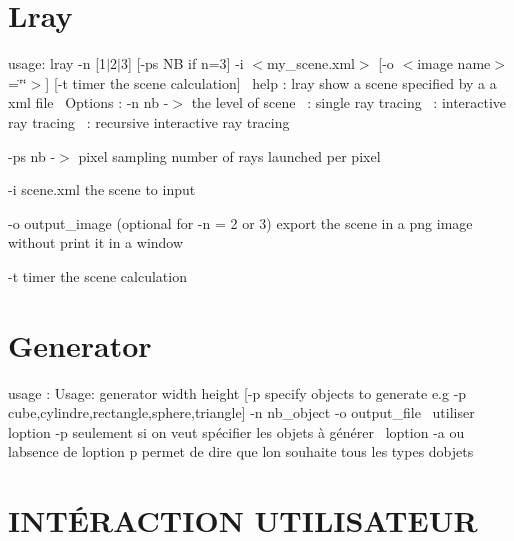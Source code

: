 \section*{Lray}

usage\+: lray -\/n \mbox{[}1$\vert$2$\vert$3\mbox{]} \mbox{[}-\/ps NB if n=3\mbox{]} -\/i $<$my\+\_\+scene.\+xml$>$ \mbox{[}-\/o $<$image name$>$=\char`\"{}\char`\"{}$>$\mbox{]} \mbox{[}-\/t timer the scene calculation\mbox{]}~\newline
 help \+: lray show a scene specified by a a xml file~\newline
 Options \+: -\/n nb -\/$>$ the level of scene ~\+: single ray tracing ~\+: interactive ray tracing ~\+: recursive interactive ray tracing

-\/ps nb -\/$>$ pixel sampling number of rays launched per pixel

-\/i scene.\+xml the scene to input

-\/o output\+\_\+image (optional for -\/n = 2 or 3) export the scene in a png image without print it in a window

-\/t timer the scene calculation

\section*{Generator}

usage \+: Usage\+: generator width height \mbox{[}-\/p specify objects to generate e.\+g -\/p cube,cylindre,rectangle,sphere,triangle\mbox{]} -\/n nb\+\_\+object -\/o output\+\_\+file~\newline
 utiliser l\textquotesingle{}option -\/p seulement si on veut spécifier les objets à générer~\newline
 l\textquotesingle{}option -\/a ou l\textquotesingle{}absence de l\textquotesingle{}option p permet de dire que l\textquotesingle{}on souhaite tous les types d\textquotesingle{}objets

\section*{I\+N\+TÉ\+R\+A\+C\+T\+I\+ON U\+T\+I\+L\+I\+S\+A\+T\+E\+UR}

